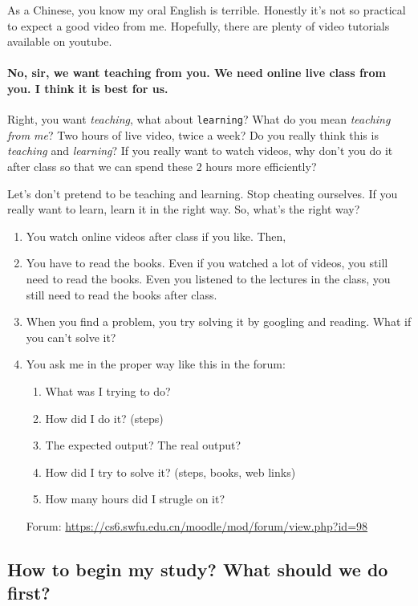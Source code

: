 \documentclass{article}
\begin{document}
As a Chinese, you know my oral English is terrible. Honestly it's not so practical to
expect a good video from me. Hopefully, there are plenty of video tutorials available on
youtube.

\paragraph{No, sir, we want teaching from you. We need online live class from you. I think
  it is best for us.}

Right, you want \emph{teaching}, what about \texttt{learning}?  What do you mean
\emph{teaching from me}? Two hours of live video, twice a week? Do you really think this
is \emph{teaching} and \emph{learning}? If you really want to watch videos, why don't you
do it after class so that we can spend these 2 hours more efficiently?

Let's don't pretend to be teaching and learning. Stop cheating ourselves.  If you really
want to learn, learn it in the right way. So, what's the right way?
\begin{enumerate}
\item You watch online videos after class if you like. Then,
\item You have to read the books. Even if you watched a lot of videos, you still need to
  read the books. Even you listened to the lectures in the class, you still need to read
  the books after class.
\item When you find a problem, you try solving it by googling and reading. What if you
  can't solve it?
\item You ask me in the proper way like this in the forum:
  \begin{enumerate}
  \item What was I trying to do?
  \item How did I do it? (steps)
  \item The expected output? The real output?
  \item How did I try to solve it? (steps, books, web links)
  \item How many hours did I strugle on it?
  \end{enumerate}
  Forum: \url{https://cs6.swfu.edu.cn/moodle/mod/forum/view.php?id=98}
\end{enumerate}

\subsection[How to begin?]{How to begin my study? What should we do first?}
\label{sec:begin}
\end{document}
